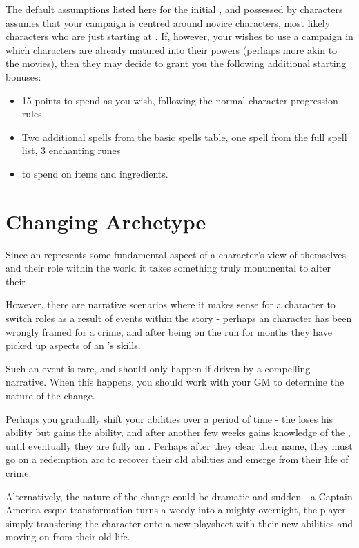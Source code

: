 The default assumptions listed here for the initial ,  and  possessed by characters assumes that your campaign is centred around novice characters, most likely characters who are just starting at . If, however, your  wishes to use a campaign in which characters are already matured into their powers (perhaps more akin to the  movies), then they may decide to grant you the following additional starting bonuses:

\begin{itemize}
	\item 15  points to spend as you wish, following the normal character progression rules
	\item Two additional spells from the basic spells table,  one spell from the full spell list,  3 enchanting runes
	\item {} to spend on items and ingredients.
\end{itemize}

\section{Changing Archetype}

Since an  represents some fundamental aspect of a character's view of themselves and their role within the world it takes something truly monumental to alter their . 

However, there are narrative scenarios where it makes sense for a character to switch roles as a result of events within the story - perhaps an  character has been wrongly framed for a crime, and after being on the run for months they have picked up aspects of an 's skills. 

Such an event is rare, and should only happen if driven by a compelling narrative. When this happens, you should work with your GM to determine the nature of the change. 

Perhaps you gradually shift your abilities over a period of time - the  loses his  ability but gains the  ability, and after another few weeks gains knowledge of the , until eventually they are fully an . Perhaps after they clear their name, they must go on a redemption arc to recover their old abilities and emerge from their life of crime.

Alternatively, the nature of the change could be dramatic and sudden - a Captain America-esque transformation turns a weedy  into a mighty  overnight, the player simply transfering the character onto a new playsheet with their new abilities and moving on from their old life. 

